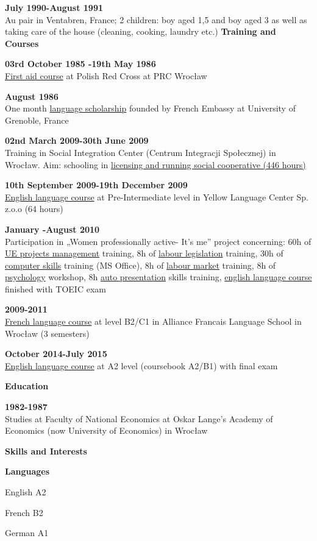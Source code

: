 \documentclass[a4paper,12pt,final]{memoir}
\newcommand{\SmallSep}{\vspace{0.5em}}
\newenvironment{Career Profile}
	{\ignorespaces\textbf{\color{ForestGreen} Career Profile}}
	{\Sep\ignorespacesafterend}
\newenvironment{Key experience}
	{\ignorespaces\textbf{\color{ForestGreen} Key experience}}
	{\Sep\ignorespacesafterend}
\newcommand{\CVSection}[1]
	{\Large\textbf{#1}\par
	\SmallSep\normalsize\normalfont}
\newcommand{\CVItem}[1]
	{\textbf{\color{ForestGreen} #1}}
\begin{document}
\CVItem{July 1990-August 1991}\\
Au pair in Ventabren, France; 2 children: boy aged 1,5 and boy aged 3 as well as taking care of the house (cleaning, cooking, laundry etc.)
\SmallSep
\clearpage
\framebreak
\framebreak
\CVSection{Training and Courses}
\CVItem{ 03rd October 1985 -19th May 1986}\\
\underline{First aid course} at Polish Red Cross at PRC Wrocław
\SmallSep

\CVItem{August 1986}\\
One month \underline{language scholarship} founded by French Embassy at University of Grenoble, France
\SmallSep

\CVItem{02nd March 2009-30th June 2009	}\\
Training in Social Integration Center (Centrum Integracji Społecznej) in 	Wrocław. Aim: schooling in \underline{licensing and running social cooperative (446 hours)}
\SmallSep

\CVItem{10th September 2009-19th December 2009}\\
\underline{English language course} at Pre-Intermediate level in Yellow Language Center 	Sp. z.o.o  (64 hours)
\SmallSep

\CVItem{January -August 2010 }\\
Participation in „Women professionally active- It's me” project concerning: 60h of \underline{UE projects management} training, 8h of \underline{labour legislation} training, 30h of \underline{computer skills} training (MS Office), 8h of \underline{labour market} training, 8h of \underline{psychology} workshop, 8h \underline{auto presentation} skills training,  \underline{english language course} finished with TOEIC exam
\SmallSep

\CVItem{2009-2011}\\
\underline{French language course} at level B2/C1 in Alliance Francais Language School in Wrocław (3 semesters)
\SmallSep

\CVItem{October 2014-July 2015}\\
\underline{English language course} at A2 level (coursebook A2/B1)
with final exam
\SmallSep

\CVSection{Education}
\CVItem{1982-1987}\\
Studies at Faculty of National Economics at Oskar Lange's Academy of Economics (now University of Economics) in Wrocław
\SmallSep


\CVSection{Skills and Interests}
\CVItem{Languages}
\begin{multicols}{3}
\begin{compactitem}[\color{ForestGreen}$\circ$]
	\item English A2
	\item French  B2
	\item German  A1
\end{compactitem}
\end{multicols}
\SmallSep
\end{document}

